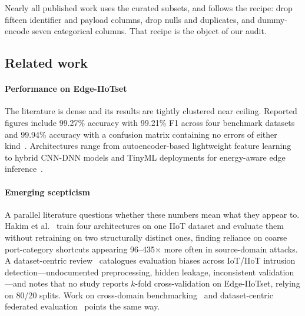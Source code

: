 Nearly all published work uses the curated subsets, and follows the
 recipe: drop fifteen identifier and payload columns, drop
nulls and duplicates, and dummy-encode seven categorical columns. That recipe
is the object of our audit.

\subsection{Related work}

\paragraph{Performance on Edge-IIoTset} The literature is dense and its results
are tightly clustered near ceiling. Reported figures include 99.27\% accuracy
with 99.21\% F1 across four benchmark datasets~\cite{discover2026hybrid} and
99.94\% accuracy with a confusion matrix containing no errors of either
kind~\cite{hasan2025autoencoder}.
Architectures range from autoencoder-based lightweight feature
learning~\cite{hasan2025autoencoder} to hybrid CNN-DNN models and TinyML
deployments for energy-aware edge inference~\cite{screports2026tinyml}.

\paragraph{Emerging scepticism} A parallel literature questions whether these
numbers mean what they appear to. Hakim et al.~\cite{hakim2026crossdomain}
train four architectures on one IIoT dataset and evaluate them without
retraining on two structurally distinct ones, finding reliance on coarse
port-category shortcuts appearing 96--435$\times$ more often in source-domain
attacks. A dataset-centric review~\cite{frontiers2026datasetcentric} catalogues
evaluation biases across IoT/IIoT intrusion detection---undocumented
preprocessing, hidden leakage, inconsistent validation---and notes that no
study reports $k$-fold cross-validation on Edge-IIoTset, relying on 80/20
splits. Work on cross-domain benchmarking~\cite{bridge2026tchnet} and
dataset-centric federated evaluation~\cite{screports2026federated} points the
same way.

